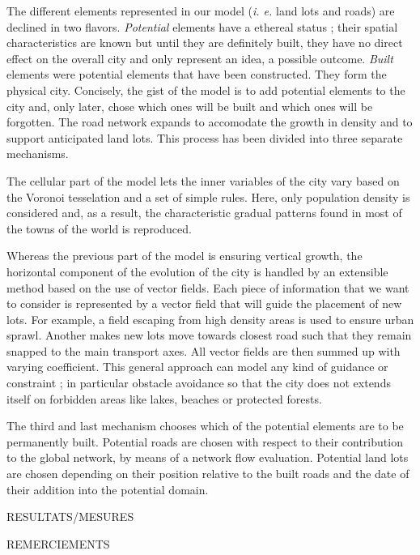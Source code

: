 \documentclass[12pt]{article}
\begin{document}
The different elements represented in our model (\textit{i. e.} land
lots and roads) are declined in two flavors. \textit{Potential}
elements have a ethereal status ; their spatial characteristics are
known but until they are definitely built, they have no direct effect
on the overall city and only represent an idea, a possible
outcome. \textit{Built} elements were potential elements that have
been constructed. They form the physical city. Concisely, the gist of
the model is to add potential elements to the city and, only later,
chose which ones will be built and which ones will be forgotten. The
road network expands to accomodate the growth in density and to
support anticipated land lots. This process has been divided into
three separate mechanisms.

The cellular part of the model lets the inner variables of the city
vary based on the Voronoi tesselation and a set of simple rules. Here,
only population density is considered and, as a result, the
characteristic gradual patterns found in most of the towns of the
world is reproduced.

Whereas the previous part of the model is ensuring vertical growth,
the horizontal component of the evolution of the city is handled by an
extensible method based on the use of vector fields. Each piece of
information that we want to consider is represented by a vector field
that will guide the placement of new lots. For example, a field
escaping from high density areas is used to ensure urban
sprawl. Another makes new lots move towards closest road such that
they remain snapped to the main transport axes. All vector fields are
then summed up with varying coefficient. This general approach can
model any kind of guidance or constraint ; in particular obstacle
avoidance so that the city does not extends itself on forbidden areas
like lakes, beaches or protected forests.

The third and last mechanism chooses which of the potential elements
are to be permanently built. Potential roads are chosen with respect
to their contribution to the global network, by means of a network
flow evaluation. Potential land lots are chosen depending on their
position relative to the built roads and the date of their addition
into the potential domain.

RESULTATS/MESURES

\newpage

\tableofcontents

\newpage

REMERCIEMENTS
\end{document}
